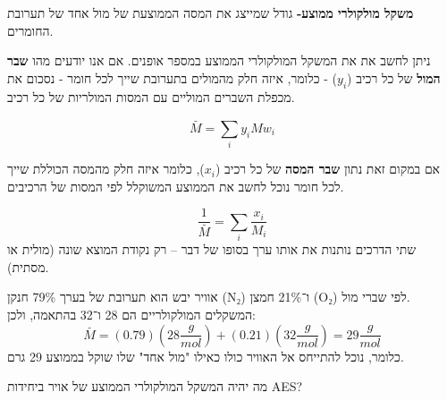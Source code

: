 \documentclass[
  hebrew,
  letterpaper,
  DIV=11,
  numbers=noendperiod]{scrreprt}
\begin{document}
\textbf{{משקל מולקולרי ממוצע-}} {גודל שמייצג את המסה הממוצעת של מול אחד
של תערובת החומרים}.

{ניתן לחשב את את המשקל המולקולרי הממוצע במספר אופנים. אם אנו יודעים מהו
\textbf{שבר המול} של כל רכיב} (\(y_{i}\)) - {כלומר, איזה חלק מהמולים
בתערובת שייך לכל חומר - נסכום את מכפלת השברים המוליים עם המסות המולריות
של כל רכיב.}

\[\overset{ˉ}{M} = \sum_{i}^{}{y_{i}{Mw}_{i}}\]

{אם במקום זאת נתון \textbf{שבר המסה} של כל רכיב (}\(x_{i}\){), כלומר
איזה חלק מהמסה הכוללת שייך לכל חומר נוכל לחשב את הממוצע המשוקלל לפי
המסות של הרכיבים.}

\[\frac{1}{\overset{ˉ}{M}} = \sum_{i}^{}\frac{x_{i}}{M_{i}}\] {שתי
הדרכים נותנות את אותו ערך בסופו של דבר -- רק נקודת המוצא שונה (מולית או
מסתית)}.

{אוויר יבש הוא תערובת של בערך 79\% חנקן} (N₂) {ו־21\% חמצן} (O₂) {לפי
שברי מול}.\\
{המשקלים המולקולריים הם 28 ו־32 בהתאמה, ולכן}:
\[\overset{ˉ}{M} = (0.79)\left( 28\frac{g}{mol} \right) + (0.21)\left( 32\frac{g}{mol} \right) = 29\frac{g}{mol}\]
{כלומר, נוכל להתייחס אל האוויר כולו כאילו "מול אחד" שלו שוקל בממוצע 29
גרם}.

{מה יהיה המשקל המולקולרי הממוצע של אויר ביחידות} AES{?}
\end{document}
